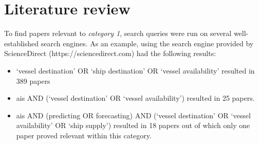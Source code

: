\section{Literature review}

To find papers relevant to \textit{category 1}, search queries were run on several well-established search engines. As an example, using the search engine provided by ScienceDirect (https://sciencedirect.com) had the following results:

\begin{itemize}
    \item `vessel destination' OR `ship destination' OR `vessel availability' resulted in 389 papers
    \item ais AND (`vessel destination' OR `vessel availability') resulted in 25 papers.
    \item ais AND (predicting OR forecasting) AND (`vessel destination' OR `vessel availability' OR `ship supply') resulted in 18 papers out of which only one paper proved relevant within this category.
\end{itemize}